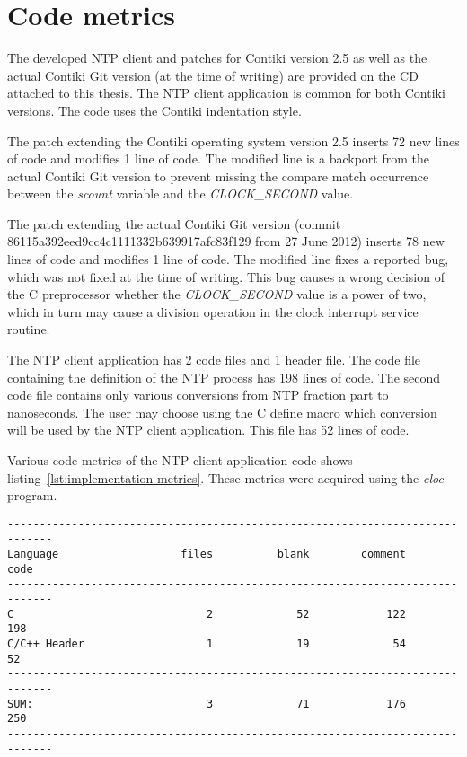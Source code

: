 
\section{Code metrics}
The developed NTP client and patches for Contiki version 2.5
as well as the actual Contiki Git version (at the time of writing)
are provided on the CD attached to this thesis.
The NTP client application is common for both Contiki versions.
The code uses the Contiki indentation style.

The patch extending the Contiki operating system version 2.5
inserts 72 new lines of code and modifies 1 line of code.
The modified line is a backport from the actual Contiki Git version to prevent
missing the compare match occurrence between the {\it{scount}} variable and
the {\it{CLOCK\_SECOND}} value.

The patch extending the actual Contiki Git version
(commit 86115a392eed9cc4c1111332b639917afc83f129 from 27 June 2012)
inserts 78 new lines of code and modifies 1 line of code.
The modified line fixes a reported bug, which was not fixed at the time of writing.
This bug causes a wrong decision of the C preprocessor whether the {\it{CLOCK\_SECOND}}
value is a power of two, which in turn may cause a division operation in
the clock interrupt service routine.

The NTP client application has 2 code files and 1 header file.
The code file containing the definition of the NTP process
has 198 lines of code.
The second code file contains only various conversions from NTP fraction part
to nanoseconds.
The user may choose using the C define macro which conversion will be used
by the NTP client application.
This file has 52 lines of code.

Various code metrics of the NTP client application code
shows listing~\ref{lst:implementation-metrics}.
These metrics were acquired using the {\it{cloc}} program.
\begin{lstlisting}[caption={NTP client application code metrics},label={lst:implementation-metrics}]
-----------------------------------------------------------------------------
Language                   files          blank        comment           code
-----------------------------------------------------------------------------
C                              2             52            122            198
C/C++ Header                   1             19             54             52
-----------------------------------------------------------------------------
SUM:                           3             71            176            250
-----------------------------------------------------------------------------
\end{lstlisting}
